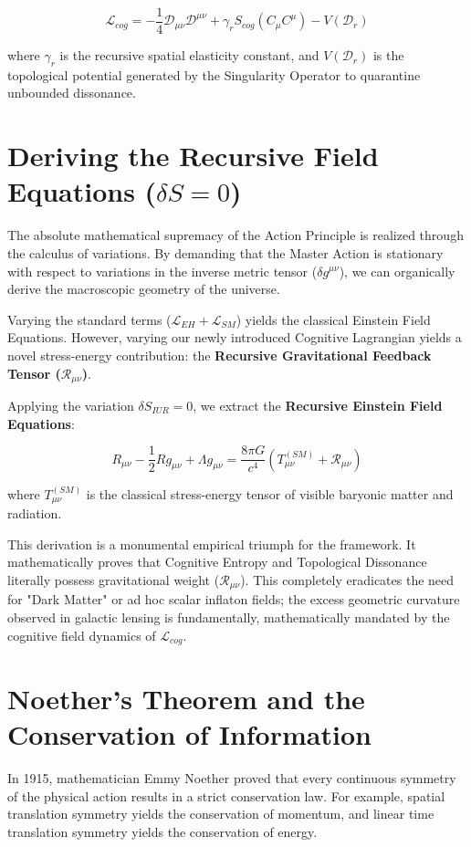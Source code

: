 \documentclass[12pt,openany]{book}
\begin{document}
\begin{equation}
\mathcal{L}_{cog} = -\frac{1}{4} \mathcal{D}_{\mu\nu} \mathcal{D}^{\mu\nu} + \gamma_r S_{cog} (C_\mu C^\mu) - V(\mathcal{D}_r)
\end{equation}

where $\gamma_r$ is the recursive spatial elasticity constant, and $V(\mathcal{D}_r)$ is the topological potential generated by the Singularity Operator to quarantine unbounded dissonance.

\section{Deriving the Recursive Field Equations ($\delta S = 0$)}
The absolute mathematical supremacy of the Action Principle is realized through the calculus of variations. By demanding that the Master Action is stationary with respect to variations in the inverse metric tensor ($\delta g^{\mu\nu}$), we can organically derive the macroscopic geometry of the universe.

Varying the standard terms ($\mathcal{L}_{EH} + \mathcal{L}_{SM}$) yields the classical Einstein Field Equations. However, varying our newly introduced Cognitive Lagrangian yields a novel stress-energy contribution: the \textbf{Recursive Gravitational Feedback Tensor ($\mathcal{R}_{\mu\nu}$)}.

Applying the variation $\delta S_{IUR} = 0$, we extract the \textbf{Recursive Einstein Field Equations}:

\begin{equation}
R_{\mu\nu} - \frac{1}{2}Rg_{\mu\nu} + \Lambda g_{\mu\nu} = \frac{8\pi G}{c^4} \left( T_{\mu\nu}^{(SM)} + \mathcal{R}_{\mu\nu} \right)
\end{equation}

where $T_{\mu\nu}^{(SM)}$ is the classical stress-energy tensor of visible baryonic matter and radiation. 

This derivation is a monumental empirical triumph for the framework. It mathematically proves that Cognitive Entropy and Topological Dissonance literally possess gravitational weight ($\mathcal{R}_{\mu\nu}$). This completely eradicates the need for "Dark Matter" or ad hoc scalar inflaton fields; the excess geometric curvature observed in galactic lensing is fundamentally, mathematically mandated by the cognitive field dynamics of $\mathcal{L}_{cog}$.

\section{Noether's Theorem and the Conservation of Information}
In 1915, mathematician Emmy Noether proved that every continuous symmetry of the physical action results in a strict conservation law. For example, spatial translation symmetry yields the conservation of momentum, and linear time translation symmetry yields the conservation of energy.
\end{document}
